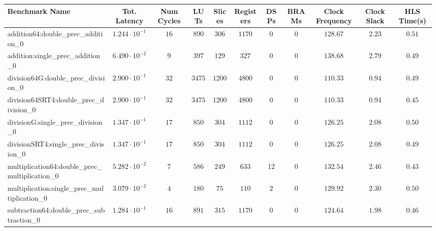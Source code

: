 \begin{tabular}{|l|c|c|c|c|c|c|c|c|c|c|}
\hline
Benchmark Name                                   & Tot. Latency            & Num Cycles & LUTs      & Slices   & Registers & DSPs   & BRAMs & Clock Frequency & Clock Slack & HLS Time(s) \\
\hline
addition64:double\_prec\_addition\_0             & $ 1.244 \cdot 10^{-1} $ & $ 16     $ & $ 890   $ & $ 306  $ & $ 1170  $ & $ 0  $ & $ 0 $ & $ 128.67      $ & $ 2.23    $ & $ 0.51    $ \\
addition:single\_prec\_addition\_0               & $ 6.490 \cdot 10^{-2} $ & $ 9      $ & $ 397   $ & $ 129  $ & $ 327   $ & $ 0  $ & $ 0 $ & $ 138.68      $ & $ 2.79    $ & $ 0.49    $ \\
division64G:double\_prec\_division\_0            & $ 2.900 \cdot 10^{-1} $ & $ 32     $ & $ 3475  $ & $ 1200 $ & $ 4800  $ & $ 0  $ & $ 0 $ & $ 110.33      $ & $ 0.94    $ & $ 0.49    $ \\
division64SRT4:double\_prec\_division\_0         & $ 2.900 \cdot 10^{-1} $ & $ 32     $ & $ 3475  $ & $ 1200 $ & $ 4800  $ & $ 0  $ & $ 0 $ & $ 110.33      $ & $ 0.94    $ & $ 0.45    $ \\
divisionG:single\_prec\_division\_0              & $ 1.347 \cdot 10^{-1} $ & $ 17     $ & $ 850   $ & $ 304  $ & $ 1112  $ & $ 0  $ & $ 0 $ & $ 126.25      $ & $ 2.08    $ & $ 0.50    $ \\
divisionSRT4:single\_prec\_division\_0           & $ 1.347 \cdot 10^{-1} $ & $ 17     $ & $ 850   $ & $ 304  $ & $ 1112  $ & $ 0  $ & $ 0 $ & $ 126.25      $ & $ 2.08    $ & $ 0.49    $ \\
multiplication64:double\_prec\_multiplication\_0 & $ 5.282 \cdot 10^{-2} $ & $ 7      $ & $ 586   $ & $ 249  $ & $ 633   $ & $ 12 $ & $ 0 $ & $ 132.54      $ & $ 2.46    $ & $ 0.43    $ \\
multiplication:single\_prec\_multiplication\_0   & $ 3.079 \cdot 10^{-2} $ & $ 4      $ & $ 180   $ & $ 75   $ & $ 110   $ & $ 2  $ & $ 0 $ & $ 129.92      $ & $ 2.30    $ & $ 0.50    $ \\
subtraction64:double\_prec\_subtraction\_0       & $ 1.284 \cdot 10^{-1} $ & $ 16     $ & $ 891   $ & $ 315  $ & $ 1170  $ & $ 0  $ & $ 0 $ & $ 124.64      $ & $ 1.98    $ & $ 0.46    $ \\

\end{tabular}
